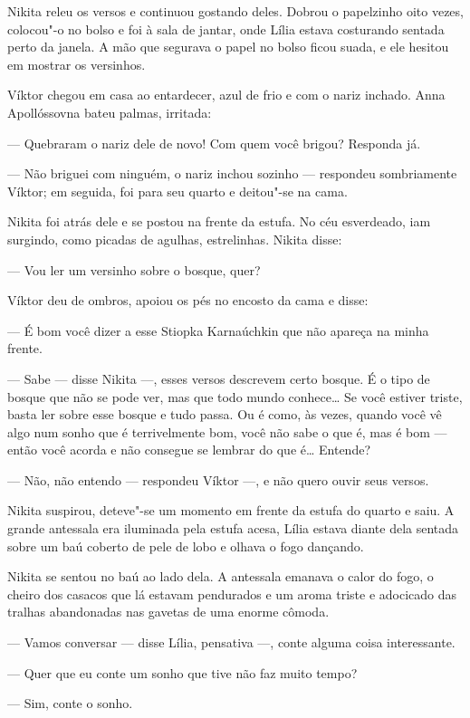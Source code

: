 Nikita releu os versos e continuou gostando deles. Dobrou o papelzinho
oito vezes, colocou"-o no bolso e foi à sala de jantar, onde Lília estava
costurando sentada perto da janela. A mão que segurava o papel no bolso
ficou suada, e ele hesitou em mostrar os versinhos.

Víktor chegou em casa ao entardecer, azul de frio e com o nariz inchado.
Anna Apollóssovna bateu palmas, irritada:

--- Quebraram o nariz dele de novo! Com quem você brigou? Responda já.

--- Não briguei com ninguém, o nariz inchou sozinho --- respondeu
sombriamente Víktor; em seguida, foi para seu quarto e deitou"-se na
cama.

Nikita foi atrás dele e se postou na frente da estufa. No céu
esverdeado, iam surgindo, como picadas de agulhas, estrelinhas. Nikita
disse:

--- Vou ler um versinho sobre o bosque, quer?

Víktor deu de ombros, apoiou os pés no encosto da cama e disse:

--- É bom você dizer a esse Stiopka Karnaúchkin que não apareça na minha
frente.

--- Sabe --- disse Nikita ---, esses versos descrevem certo bosque. É o
tipo de bosque que não se pode ver, mas que todo mundo conhece\ldots{} Se
você estiver triste, basta ler sobre esse bosque e tudo passa. Ou é
como, às vezes, quando você vê algo num sonho que é terrivelmente bom,
você não sabe o que é, mas é bom --- então você acorda e não consegue se
lembrar do que é\ldots{} Entende?

--- Não, não entendo --- respondeu Víktor ---, e não quero ouvir seus
versos.

Nikita suspirou, deteve"-se um momento em frente da estufa do quarto e
saiu. A grande antessala era iluminada pela estufa acesa, Lília estava
diante dela sentada sobre um baú coberto de pele de lobo e olhava o fogo
dançando.

Nikita se sentou no baú ao lado dela. A antessala emanava o calor do
fogo, o cheiro dos casacos que lá estavam pendurados e um aroma triste e
adocicado das tralhas abandonadas nas gavetas de uma enorme cômoda.

--- Vamos conversar --- disse Lília, pensativa ---, conte alguma coisa
interessante.

--- Quer que eu conte um sonho que tive não faz muito tempo?

--- Sim, conte o sonho.

